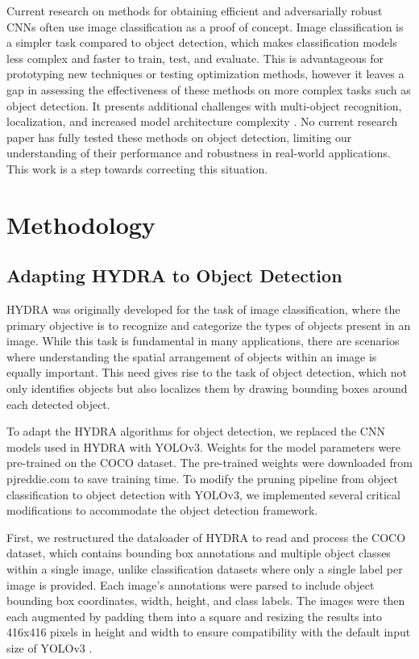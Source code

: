 \documentclass[journal,onecolumn,12pt]{IEEEtran}
\begin{document}
Current research on methods for obtaining efficient and adversarially robust CNNs often use image classification as a proof of concept. Image classification is a simpler task compared to object detection, which makes classification models less complex and faster to train, test, and evaluate. This is advantageous for prototyping new techniques or testing optimization methods, however it leaves a gap in assessing the effectiveness of these methods on more complex tasks such as object detection. It presents additional challenges with multi-object recognition, localization, and increased model architecture complexity \cite{10099639}. No current research paper has fully tested these methods on object detection, limiting our understanding of their performance and robustness in real-world applications. This work is a step towards correcting this situation.

\section{Methodology}

\subsection{Adapting HYDRA to Object Detection}
HYDRA was originally developed for the task of image classification, where the primary objective is to recognize and categorize the types of objects present in an image. While this task is fundamental in many applications, there are scenarios where understanding the spatial arrangement of objects within an image is equally important. This need gives rise to the task of object detection, which not only identifies objects but also localizes them by drawing bounding boxes around each detected object.

To adapt the HYDRA algorithms for object detection, we replaced the CNN models used in HYDRA with YOLOv3. Weights for the model parameters were pre-trained on the COCO dataset. The pre-trained weights were downloaded from pjreddie.com to save training time. To modify the pruning pipeline from object classification to object detection with YOLOv3, we implemented several critical modifications to accommodate the object detection framework. 

First, we restructured the dataloader of HYDRA to read and process the COCO dataset, which contains bounding box annotations and multiple object classes within a single image, unlike classification datasets where only a single label per image is provided. Each image’s annotations were parsed to include object bounding box coordinates, width, height, and class labels. The images were then each augmented by padding them into a square and resizing the results into 416x416 pixels in height and width to ensure compatibility with the default input size of YOLOv3 \cite{architecture}.
\end{document}
